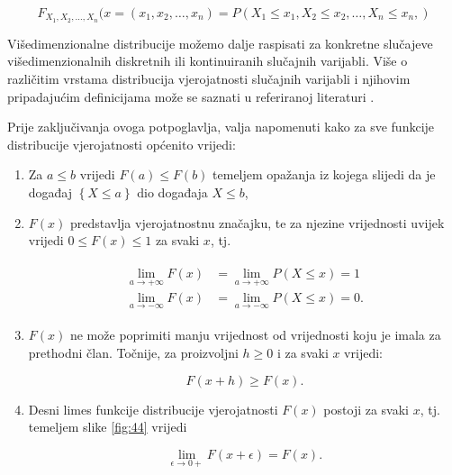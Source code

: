 \documentclass[a4paper,12pt,oneside]{memoir}
\begin{document}
                \begin{equation}
                    F_{X_1,X_2,\ldots,X_n}(x=(x_1,x_2,\ldots,x_n)=P(X_1\leq x_1,X_2\leq x_2,\ldots,X_n\leq x_n,)
                \end{equation}

                Višedimenzionalne distribucije možemo dalje raspisati za konkretne slučajeve višedimenzionalnih diskretnih ili kontinuiranih slučajnih varijabli. Više o različitim vrstama distribucija vjerojatnosti slučajnih varijabli i njihovim pripadajućim definicijama može se saznati u referiranoj literaturi \cite{Bahovec, Dekking}.

                Prije zaključivanja ovoga potpoglavlja, valja napomenuti kako za sve funkcije distribucije vjerojatnosti općenito vrijedi:

                \begin{enumerate}
                    \item Za $a\leq b$ vrijedi $F(a)\leq F(b)$ temeljem opažanja iz kojega slijedi da je događaj $\left\{X\leq a\right\}$ dio događaja ${X\leq b}$,
                    \item $F(x)$ predstavlja vjerojatnostnu značajku, te za njezine vrijednosti uvijek vrijedi $0\leq F(x)\leq 1$ za svaki $x$, tj.

                    \begin{align*}
                        \begin{split}
                            \lim\limits_{a\to+\infty}F(x)&=\lim\limits_{a\to+\infty}P(X\leq x)=1\\
                            \lim\limits_{a\to-\infty}F(x)&=\lim\limits_{a\to-\infty}P(X\leq x)=0.
                        \end{split}
                    \end{align*}
                    \item $F(x)$ ne može poprimiti manju vrijednost od vrijednosti koju je imala za prethodni član. Točnije, za proizvoljni $h\geq 0$ i za svaki $x$ vrijedi:
                    
                    \begin{equation}
                        F(x+h)\geq F(x).
                    \end{equation}

                    \item Desni limes funkcije distribucije vjerojatnosti $F(x)$ postoji za svaki $x$, tj. temeljem slike \ref{fig:44} vrijedi
                    
                    \begin{equation}
                        \lim\limits_{\epsilon\to 0+}F(x+\epsilon)=F(x).
                    \end{equation}
                \end{enumerate}
\end{document}
